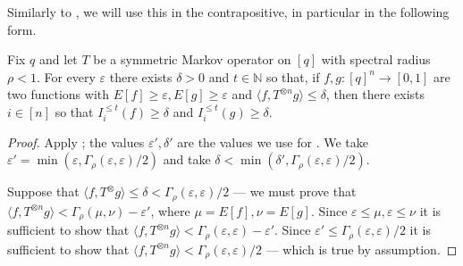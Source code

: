\documentclass[a4paper,11pt, DIV=11]{scrartcl}
\renewcommand{\epsilon}{\varepsilon}
\theoremstyle{plain}
\theoremstyle{definition}
\begin{document}
Similarly to \cite{Dinur09:sicomp}, we will use this in the contrapositive, in particular in the following form.

\begin{corollary}\label{cor:technical}
    Fix $q$ and let $T$ be a symmetric Markov operator on $[q]$ with spectral radius $\rho < 1$. For every $\epsilon$ there exists $\delta > 0$ and $t \in \mathbb{N}$ so that, if $f, g : [q]^n \to [0, 1]$ are two functions with $E[f] \geq \epsilon, E[g] \geq \epsilon$ and $\langle f, T^{\otimes n} g\rangle \leq \delta$, then there exists $i \in [n]$ so that $I_i^{\leq t}(f) \geq \delta$ and $I_i^{\leq t}(g) \geq \delta$.
\end{corollary}
\begin{proof}
Apply ; the values $\epsilon', \delta'$ are the values we use for . We take $\epsilon' = \min(\epsilon, \Gamma_\rho(\epsilon, \epsilon) / 2)$ and take $\delta < \min(\delta', \Gamma_\rho(\epsilon, \epsilon)/2)$.

Suppose that $\langle f, T^\otimes g \rangle \leq \delta < \Gamma_\rho(\epsilon, \epsilon) / 2$ --- we must prove that $\langle f, T^{\otimes n} g\rangle < \Gamma_\rho(\mu, \nu) - \epsilon'$, where $\mu = E[f], \nu = E[g]$. Since $\epsilon \leq \mu, \epsilon \leq \nu$ it is sufficient to show that $\langle f, T^{\otimes n} g \rangle < \Gamma_\rho(\epsilon, \epsilon) - \epsilon'$. Since $\epsilon' \leq \Gamma_\rho(\epsilon, \epsilon) / 2$ it is sufficient to show that $\langle f, T^{\otimes n} g \rangle < \Gamma_\rho(\epsilon, \epsilon) / 2 $ --- which is true by assumption.
\end{proof}
\end{document}
